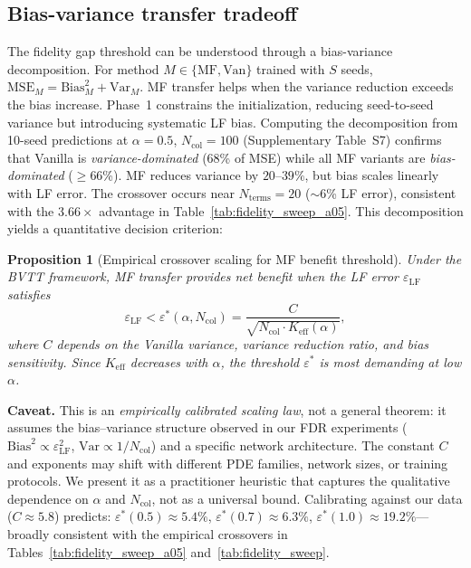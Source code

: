 \documentclass[preprint,12pt]{elsarticle}
\newtheorem{proposition}{Proposition}
\newcommand{\Ncol}{N_{\mathrm{col}}}
\begin{document}
\subsection{Bias-variance transfer tradeoff}
\label{sec:bvtt}

The fidelity gap threshold can be understood through a bias-variance decomposition. For method $M \in \{\text{MF}, \text{Van}\}$ trained with $S$ seeds, $\mathrm{MSE}_M = \mathrm{Bias}^2_M + \mathrm{Var}_M$. MF transfer helps when the variance reduction exceeds the bias increase. Phase~1 constrains the initialization, reducing seed-to-seed variance but introducing systematic LF bias. Computing the decomposition from 10-seed predictions at $\alpha = 0.5$, $\Ncol = 100$ (Supplementary Table~S7) confirms that Vanilla is \emph{variance-dominated} (68\% of MSE) while all MF variants are \emph{bias-dominated} ($\geq$66\%). MF reduces variance by $20$--$39\%$, but bias scales linearly with LF error. The crossover occurs near $N_{\mathrm{terms}} = 20$ ($\sim$6\% LF error), consistent with the $3.66\times$ advantage in Table~\ref{tab:fidelity_sweep_a05}. This decomposition yields a quantitative decision criterion:

\begin{proposition}[Empirical crossover scaling for MF benefit threshold]
\label{prop:crossover}
Under the BVTT framework, MF transfer provides net benefit when the LF error $\varepsilon_{\mathrm{LF}}$ satisfies
\begin{equation}
\label{eq:crossover}
\varepsilon_{\mathrm{LF}} < \varepsilon^*(\alpha, \Ncol) = \frac{C}{\sqrt{\Ncol \cdot K_{\mathrm{eff}}(\alpha)}},
\end{equation}
where $C$ depends on the Vanilla variance, variance reduction ratio, and bias sensitivity. Since $K_{\mathrm{eff}}$ decreases with $\alpha$, the threshold $\varepsilon^*$ is most demanding at low $\alpha$.
\end{proposition}

\textbf{Caveat.} This is an \emph{empirically calibrated scaling law}, not a general theorem: it assumes the bias--variance structure observed in our FDR experiments ($\mathrm{Bias}^2 \propto \varepsilon_{\mathrm{LF}}^2$, $\mathrm{Var} \propto 1/\Ncol$) and a specific network architecture. The constant $C$ and exponents may shift with different PDE families, network sizes, or training protocols. We present it as a practitioner heuristic that captures the qualitative dependence on $\alpha$ and $\Ncol$, not as a universal bound. Calibrating against our data ($C \approx 5.8$) predicts: $\varepsilon^*(0.5) \approx 5.4\%$, $\varepsilon^*(0.7) \approx 6.3\%$, $\varepsilon^*(1.0) \approx 19.2\%$---broadly consistent with the empirical crossovers in Tables~\ref{tab:fidelity_sweep_a05} and~\ref{tab:fidelity_sweep}.
\end{document}
